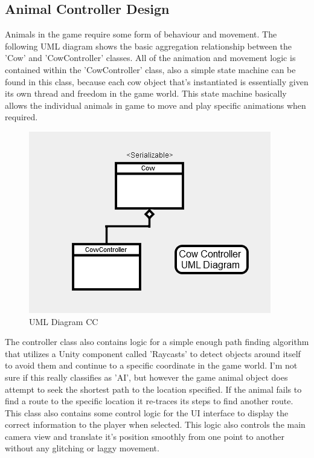 \subsection{Animal Controller Design}
Animals in the game require some form of behaviour and movement. The following UML diagram shows the basic aggregation relationship between the 'Cow' and 'CowController' classes. All of the animation and movement logic is contained within the 'CowController' class, also a simple state machine can be found in this class, because each cow object that's instantiated is essentially given its own thread and freedom in the game world. This state machine basically allows the individual animals in game to move and play specific animations when required.
\begin{figure}[!ht]
	\caption{UML Diagram CC}
	\centering
	\includegraphics{img/cow_uml.png}
\end{figure}
The controller class also contains logic for a simple enough path finding algorithm that utilizes a Unity component called 'Raycasts' to detect objects around itself to avoid them and continue to a specific coordinate in the game world. I'm not sure if this really classifies as 'AI', but however the game animal object does attempt to seek the shortest path to the location specified. If the animal fails to find a route to the specific location it re-traces its steps to find another route.
This class also contains some control logic for the UI interface to display the correct information to the player when selected. This logic also controls the main camera view and translate it's position smoothly from one point to another without any glitching or laggy movement.
